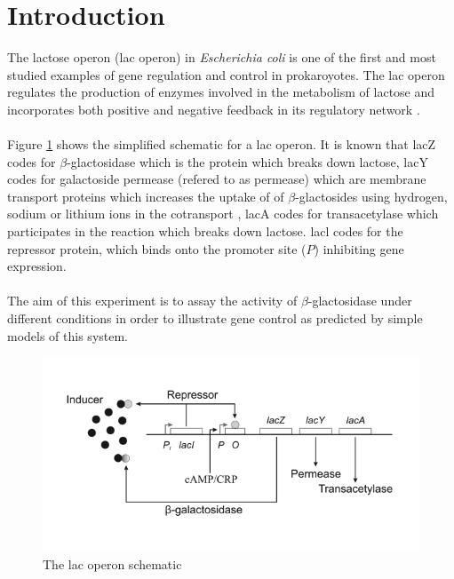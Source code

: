 \documentclass{article}
\begin{document}
\section{Introduction}
The lactose operon (lac operon) in \textit{Escherichia coli} is one of the first and most studied examples of gene regulation and control in prokaroyotes. The lac operon regulates the production of enzymes involved in the metabolism of lactose and incorporates both positive and negative feedback in its regulatory network \cite{goossens93}. \\ \\
Figure \ref{fig:lac_operon} shows the simplified schematic for a lac operon. It is known that lacZ codes for $\beta$-glactosidase which is the protein which breaks down lactose, lacY codes for galactoside permease (refered to as permease) which are membrane transport proteins which increases the uptake of of $\beta$-glactosides using hydrogen, sodium or lithium ions in the cotransport \cite{permease}, lacA codes for transacetylase which participates in the reaction which breaks down lactose. lacl codes for the repressor protein, which binds onto the promoter site ($P$) inhibiting gene expression. \\ \\
The aim of this experiment is to assay the activity of $\beta$-glactosidase under different conditions in order to illustrate gene control as predicted by simple models of this system.
\begin{figure}[htp]
	\centering
	\includegraphics[width=0.8\linewidth]{lac.png}
	\caption{The lac operon schematic}
	\label{fig:lac_operon}
\end{figure}
\end{document}
